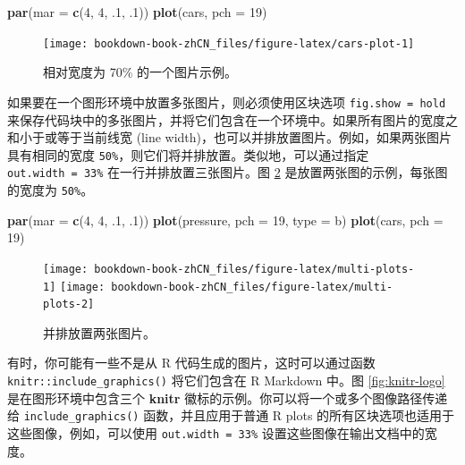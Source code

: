 \documentclass[
  12pt,
]{krantz}
\newenvironment{Shaded}{\begin{snugshade}}{\end{snugshade}}
\newcommand{\AttributeTok}[1]{\textcolor[rgb]{0.13,0.29,0.53}{#1}}
\newcommand{\DecValTok}[1]{\textcolor[rgb]{0.00,0.00,0.81}{#1}}
\newcommand{\FunctionTok}[1]{\textcolor[rgb]{0.13,0.29,0.53}{\textbf{#1}}}
\newcommand{\NormalTok}[1]{#1}
\newcommand{\StringTok}[1]{\textcolor[rgb]{0.31,0.60,0.02}{#1}}
\theoremstyle{definition}
\theoremstyle{definition}
\theoremstyle{definition}
\theoremstyle{definition}
\theoremstyle{remark}
\begin{document}
\begin{Shaded}
\begin{Highlighting}[]
\FunctionTok{par}\NormalTok{(}\AttributeTok{mar =} \FunctionTok{c}\NormalTok{(}\DecValTok{4}\NormalTok{, }\DecValTok{4}\NormalTok{, .}\DecValTok{1}\NormalTok{, .}\DecValTok{1}\NormalTok{))}
\FunctionTok{plot}\NormalTok{(cars, }\AttributeTok{pch =} \DecValTok{19}\NormalTok{)}
\end{Highlighting}
\end{Shaded}

\begin{figure}
\texttt{[image: bookdown-book-zhCN\_files/figure-latex/cars-plot-1]} \caption{相对宽度为 70\% 的一个图片示例。}\label{fig:cars-plot}
\end{figure}

如果要在一个图形环境中放置多张图片，则必须使用区块选项 \texttt{fig.show\ =\ \textquotesingle{}hold\textquotesingle{}} 来保存代码块中的多张图片，并将它们包含在一个环境中。如果所有图片的宽度之和小于或等于当前线宽 (line width)，也可以并排放置图片。例如，如果两张图片具有相同的宽度 \texttt{50\%}，则它们将并排放置。类似地，可以通过指定 \texttt{out.width\ =\ \textquotesingle{}33\%\textquotesingle{}} 在一行并排放置三张图片。图 \ref{fig:multi-plots} 是放置两张图的示例，每张图的宽度为 \texttt{50\%}。

\begin{Shaded}
\begin{Highlighting}[]
\FunctionTok{par}\NormalTok{(}\AttributeTok{mar =} \FunctionTok{c}\NormalTok{(}\DecValTok{4}\NormalTok{, }\DecValTok{4}\NormalTok{, .}\DecValTok{1}\NormalTok{, .}\DecValTok{1}\NormalTok{))}
\FunctionTok{plot}\NormalTok{(pressure, }\AttributeTok{pch =} \DecValTok{19}\NormalTok{, }\AttributeTok{type =} \StringTok{\textquotesingle{}b\textquotesingle{}}\NormalTok{)}
\FunctionTok{plot}\NormalTok{(cars, }\AttributeTok{pch =} \DecValTok{19}\NormalTok{)}
\end{Highlighting}
\end{Shaded}

\begin{figure}
\texttt{[image: bookdown-book-zhCN\_files/figure-latex/multi-plots-1]} \texttt{[image: bookdown-book-zhCN\_files/figure-latex/multi-plots-2]} \caption{并排放置两张图片。}\label{fig:multi-plots}
\end{figure}

有时，你可能有一些不是从 R 代码生成的图片，这时可以通过函数 \texttt{knitr::include\_graphics()} 将它们包含在 R Markdown 中。图 \ref{fig:knitr-logo} 是在图形环境中包含三个 \textbf{knitr} 徽标的示例。你可以将一个或多个图像路径传递给 \texttt{include\_graphics()} 函数，并且应用于普通 R plots 的所有区块选项也适用于这些图像，例如，可以使用 \texttt{out.width\ =\ \textquotesingle{}33\%\textquotesingle{}} 设置这些图像在输出文档中的宽度。
\end{document}
